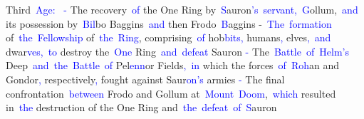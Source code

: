 \documentclass{article}
\begin{document}
\begin{tcolorbox}[colframe=black,colback=white]
{}Third\textcolor{blue}{~Age}\textcolor{blue}{:}\textcolor{blue}{~
}\textcolor{blue}{-} The recovery\textcolor{blue}{~of} the One Ring by\textcolor{blue}{~S}auron\textcolor{blue}{'s}\textcolor{blue}{~servant}\textcolor{blue}{,}\textcolor{blue}{~G}ollum,\textcolor{blue}{~and} its possession by\textcolor{blue}{~Bil}bo Baggins\textcolor{blue}{~and} then Frodo\textcolor{blue}{~B}aggins\textcolor{blue}{
}-\textcolor{blue}{~The}\textcolor{blue}{~formation} of\textcolor{blue}{~the}\textcolor{blue}{~Fellowship} of\textcolor{blue}{~the}\textcolor{blue}{~Ring}, comprising\textcolor{blue}{~of} hob\textcolor{blue}{bits}\textcolor{blue}{,} humans\textcolor{blue}{,} elves\textcolor{blue}{,}\textcolor{blue}{~and} dwar\textcolor{blue}{ves}\textcolor{blue}{,}\textcolor{blue}{~to} destroy the\textcolor{blue}{~One} Ring\textcolor{blue}{~and}\textcolor{blue}{~defeat} Sauron\textcolor{blue}{
}\textcolor{blue}{-} The\textcolor{blue}{~Battle}\textcolor{blue}{~of}\textcolor{blue}{~Helm}\textcolor{blue}{'s} Deep\textcolor{blue}{~and}\textcolor{blue}{~the}\textcolor{blue}{~Battle}\textcolor{blue}{~of} Pel\textcolor{blue}{enn}or Fields\textcolor{blue}{,}\textcolor{blue}{~in} which the forces\textcolor{blue}{~of}\textcolor{blue}{~Roh}an and Gondor\textcolor{blue}{,} respectively\textcolor{blue}{,} fought against Saur\textcolor{blue}{on}\textcolor{blue}{'s} armies\textcolor{blue}{
}\textcolor{blue}{-} The final confrontation\textcolor{blue}{~between} Frodo and Gollum at\textcolor{blue}{~Mount}\textcolor{blue}{~Doom},\textcolor{blue}{~which} resulted in\textcolor{blue}{~the} destruction of the One Ring and\textcolor{blue}{~the}\textcolor{blue}{~defeat}\textcolor{blue}{~of}\textcolor{blue}{~S}auron\textcolor{blue}{

}
\end{tcolorbox}
\end{document}
